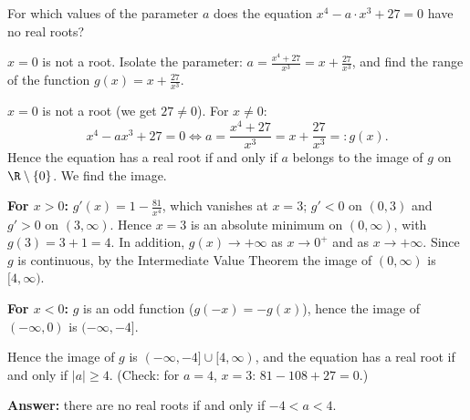 
\begin{question}
For which values of the parameter $a$ does the equation $x^4-a\cdot x^3+27=0$ have no real roots?
\end{question}

\begin{hint}
$x=0$ is not a root. Isolate the parameter: $a=\frac{x^4+27}{x^3}=x+\frac{27}{x^3}$, and find the range of the function $g(x)=x+\frac{27}{x^3}$.
\end{hint}

\begin{solution}
$x=0$ is not a root (we get $27\neq0$). For $x\neq0$:
\[
x^4-ax^3+27=0\iff a=\frac{x^4+27}{x^3}=x+\frac{27}{x^3}=:g(x).
\]
Hence the equation has a real root if and only if $a$ belongs to the image of $g$ on $\R\setminus\{0\}$. We find the image.

\textbf{For $x>0$:} $g'(x)=1-\frac{81}{x^4}$, which vanishes at $x=3$; $g'<0$ on $(0,3)$ and $g'>0$ on $(3,\infty)$. Hence $x=3$ is an absolute minimum on $(0,\infty)$, with $g(3)=3+1=4$. In addition, $g(x)\to+\infty$ as $x\to0^+$ and as $x\to+\infty$. Since $g$ is continuous, by the Intermediate Value Theorem the image of $(0,\infty)$ is $[4,\infty)$.

\textbf{For $x<0$:} $g$ is an odd function ($g(-x)=-g(x)$), hence the image of $(-\infty,0)$ is $(-\infty,-4]$.

Hence the image of $g$ is $(-\infty,-4]\cup[4,\infty)$, and the equation has a real root if and only if $|a|\ge4$. (Check: for $a=4$, $x=3$: $81-108+27=0$.)

\textbf{Answer:} there are no real roots if and only if $-4<a<4$.
\end{solution}

